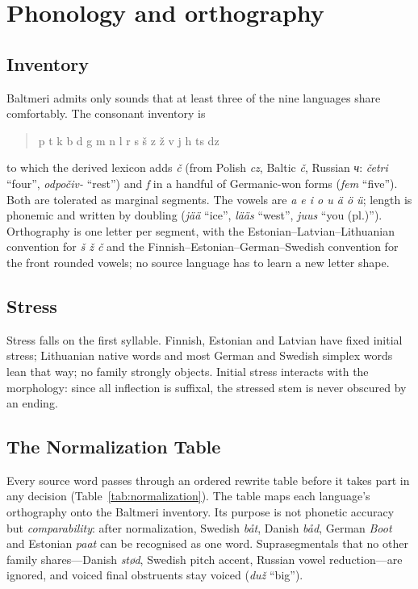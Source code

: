 \section{Phonology and orthography}\label{sec:phonology}

\subsection{Inventory}
Baltmeri admits only sounds that at least three of the nine languages share comfortably. The consonant inventory is
\begin{quote}
p t k b d g m n l r s š z ž v j h ts dz
\end{quote}
to which the derived lexicon adds \emph{č} (from Polish \emph{cz}, Baltic \emph{č}, Russian \emph{ч}: \emph{četri} ``four'', \emph{odpočiv-} ``rest'') and \emph{f} in a handful of Germanic-won forms (\emph{fem} ``five''). Both are tolerated as marginal segments. The vowels are \emph{a e i o u ä ö ü}; length is phonemic and written by doubling (\emph{jää} ``ice'', \emph{lääs} ``west'', \emph{juus} ``you (pl.)''). Orthography is one letter per segment, with the Estonian--Latvian--Lithuanian convention for \emph{š ž č} and the Finnish--Estonian--German--Swedish convention for the front rounded vowels; no source language has to learn a new letter shape.

\subsection{Stress}
Stress falls on the first syllable. Finnish, Estonian and Latvian have fixed initial stress; Lithuanian native words and most German and Swedish simplex words lean that way; no family strongly objects. Initial stress interacts with the morphology: since all inflection is suffixal, the stressed stem is never obscured by an ending.

\subsection{The Normalization Table}\label{sec:normalization}
Every source word passes through an ordered rewrite table before it takes part in any decision (Table~\ref{tab:normalization}). The table maps each language's orthography onto the Baltmeri inventory. Its purpose is not phonetic accuracy but \emph{comparability}: after normalization, Swedish \emph{båt}, Danish \emph{båd}, German \emph{Boot} and Estonian \emph{paat} can be recognised as one word. Suprasegmentals that no other family shares---Danish \emph{stød}, Swedish pitch accent, Russian vowel reduction---are ignored, and voiced final obstruents stay voiced (\emph{duž} ``big'').

